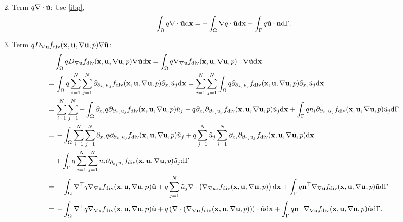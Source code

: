 \documentclass[oneside,11pt]{book}
\numberwithin{equation}{section}
\begin{document}
\begin{enumerate}[leftmargin=0in]
\begin{align*}
    \end{align*}
    \item Term $q\nabla\cdot\tilde{\bf u}$: Use \eqref{ibp},
    \begin{align*}
        \int_\Omega q\nabla\cdot\tilde{\bf u}{\rm d}{\bf x} = -\int_\Omega \nabla q\cdot\tilde{\bf u}{\rm d}{\bf x} + \int_\Gamma q\tilde{\bf u}\cdot{\bf n}{\rm d}\Gamma.
    \end{align*}
    \item Term $qD_{\nabla{\bf u}}f_{\rm div}({\bf x},{\bf u},\nabla{\bf u},p)\nabla\tilde{\bf u}$:
    \begin{align*}
        &\int_\Omega qD_{\nabla{\bf u}}f_{\rm div}({\bf x},{\bf u},\nabla{\bf u},p)\nabla\tilde{\bf u}{\rm d}{\bf x} = \int_\Omega q\nabla_{\nabla{\bf u}}f_{\rm div}({\bf x},{\bf u},\nabla{\bf u},p):\nabla\tilde{\bf u}{\rm d}{\bf x}\\
        =&\, \int_\Omega q\sum_{i=1}^N\sum_{j=1}^N \partial_{\partial_{x_i}u_j}f_{\rm div}({\bf x},{\bf u},\nabla{\bf u},p)\partial_{x_i}\tilde{u}_j{\rm d}{\bf x} = \sum_{i=1}^N\sum_{j=1}^N \int_\Omega q\partial_{\partial_{x_i}u_j}f_{\rm div}({\bf x},{\bf u},\nabla{\bf u},p)\partial_{x_i}\tilde{u}_j{\rm d}{\bf x}\\
        =&\, \sum_{i=1}^N\sum_{j=1}^N -\int_\Omega \partial_{x_i}q\partial_{\partial_{x_i}u_j}f_{\rm div}({\bf x},{\bf u},\nabla{\bf u},p)\tilde{u}_j + q\partial_{x_i}\partial_{\partial_{x_i}u_j}f_{\rm div}({\bf x},{\bf u},\nabla{\bf u},p)\tilde{u}_j{\rm d}{\bf x} + \int_\Gamma qn_i\partial_{\partial_{x_i}u_j}f_{\rm div}({\bf x},{\bf u},\nabla{\bf u},p)\tilde{u}_j{\rm d}\Gamma\\
        =&\, -\int_\Omega \sum_{i=1}^N\sum_{j=1}^N \partial_{x_i}q\partial_{\partial_{x_i}u_j}f_{\rm div}({\bf x},{\bf u},\nabla{\bf u},p)\tilde{u}_j + q\sum_{j=1}^N \tilde{u}_j\sum_{i=1}^N \partial_{x_i}\partial_{\partial_{x_i}u_j}f_{\rm div}({\bf x},{\bf u},\nabla{\bf u},p){\rm d}{\bf x}\\
        &+ \int_\Gamma q\sum_{i=1}^N\sum_{j=1}^N n_i\partial_{\partial_{x_i}u_j}f_{\rm div}({\bf x},{\bf u},\nabla{\bf u},p)\tilde{u}_j{\rm d}\Gamma\\
        =&\, -\int_\Omega \nabla^\top q\nabla_{\nabla{\bf u}}f_{\rm div}({\bf x},{\bf u},\nabla{\bf u},p)\tilde{\bf u} + q\sum_{j=1}^N \tilde{u}_j\nabla\cdot\left(\nabla_{\nabla u_j}f_{\rm div}({\bf x},{\bf u},\nabla{\bf u},p)\right){\rm d}{\bf x} + \int_\Gamma q{\bf n}^\top\nabla_{\nabla{\bf u}}f_{\rm div}({\bf x},{\bf u},\nabla{\bf u},p)\tilde{\bf u}{\rm d}\Gamma\\
        =&\, -\int_\Omega \nabla^\top q\nabla_{\nabla{\bf u}}f_{\rm div}({\bf x},{\bf u},\nabla{\bf u},p)\tilde{\bf u} + q\left(\nabla\cdot\left(\nabla_{\nabla{\bf u}}f_{\rm div}({\bf x},{\bf u},\nabla{\bf u},p)\right)\right)\cdot\tilde{\bf u}{\rm d}{\bf x} + \int_\Gamma q{\bf n}^\top\nabla_{\nabla{\bf u}}f_{\rm div}({\bf x},{\bf u},\nabla{\bf u},p)\tilde{\bf u}{\rm d}\Gamma.
    \end{align*}
\end{enumerate}
\end{document}
